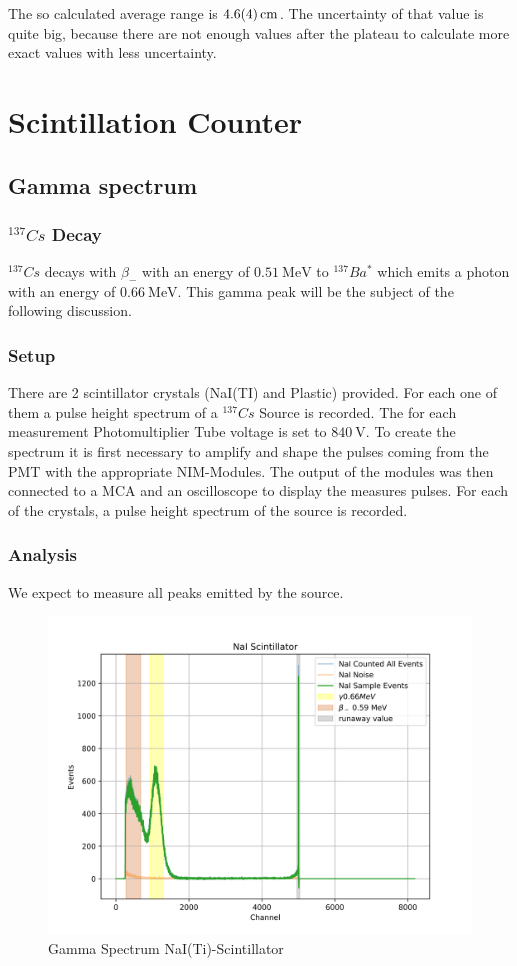 \documentclass[12pt,twoside,a4paper]{scrartcl}
\begin{document}
    The so calculated average range is $\SI{4.6 \pm 0.4}{\centi\metre}$. The uncertainty
    of that value is quite big, because there are not enough values after the plateau
    to calculate more exact values with less uncertainty.

\section{Scintillation Counter}
	\subsection{Gamma spectrum}
	\label{Gamma}
        \subsubsection{$^{137}Cs$ Decay}
        $^{137} Cs$ decays with $\beta_-$ with an energy of $\SI{0.51}{\mega\electronvolt}$ to
        $^{137}Ba^*$ which emits a photon with an energy of $\SI{0.66}{\mega\electronvolt}$.
        This gamma peak will be the subject of the following discussion.

		\subsubsection{Setup}

		There are 2 scintillator crystals (NaI(TI) and Plastic) provided. For each one of them a pulse height spectrum of a $^{137}Cs$ Source is recorded. The for each measurement Photomultiplier Tube voltage is set to $\SI{840}{\volt}$. To create the spectrum it is first necessary to amplify and shape the pulses coming from the PMT with the appropriate NIM-Modules. The output of the modules was then connected to a MCA and an oscilloscope to display the measures pulses. For each of the crystals, a pulse height spectrum of the source is recorded.

		\subsubsection{Analysis}
            We expect to measure all peaks emitted by the source.

            \begin{figure}[H]
							\centering
                \includegraphics[width = 0.8 \textwidth]{Plots/Scinti/SpektrenNaI.png}
                \caption{Gamma Spectrum NaI(Ti)-Scintillator}
            \end{figure}
\end{document}
